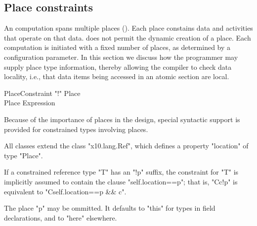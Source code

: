 \subsection{Place constraints}\label{PlaceTypes}
\label{DepType:PlaceType}

An \Xten{} computation spans multiple places
(). Each place constains data and activities that
operate on that data.  \XtenCurrVer{} does not permit the dynamic
creation of a place. Each \Xten{} computation is initiated with a
fixed number of places, as determined by a configuration parameter.
In this section we discuss how the programmer may supply place type
information, thereby allowing the compiler to check data locality,
i.e., that data items being accessed in an atomic section are local.

\begin{grammar}
PlaceConstraint     \: \xcd"!" Place\opt \\
Place              \:   Expression \\
\end{grammar}

Because of the importance of places in the \Xten{} design, special
syntactic support is provided for constrained types involving places.

All \Xten{} classes extend the class
\xcd"x10.lang.Ref", which defines a property
\xcd"location" of type
\xcd"Place".

If a constrained reference type \xcd"T" has an \xcd"!p" suffix,
the constraint for \xcd"T" is implicitly assumed to contain the clause
\xcd"self.location==p"; that is,
\xcd"C{c}!p" is equivalent to \xcd"C{self.location==p && c}".

The place \xcd"p" may be ommitted. It defaults to \xcd"this" 
for types in field declarations, and to \xcd"here" elsewhere.





